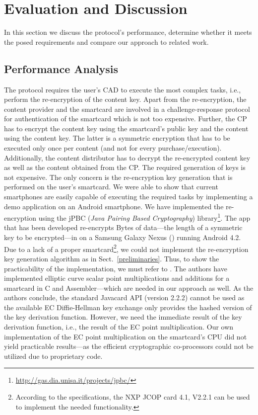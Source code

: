 \documentclass{llncs}
\newcommand{\refSec}[1]{Sect.~\ref{#1}}
\begin{document}
\section{Evaluation and Discussion} \label{evaluation}

In this section we discuss the protocol's performance, determine whether it meets the posed requirements and compare our approach to related work. 


\subsection{Performance Analysis} \label{performance_analysis}



The protocol requires the user's CAD to execute the most complex tasks, i.e., perform the re-encryption of the content key. Apart from the re-encryption, the content provider and the smartcard are involved in a challenge-response protocol for authentication of the smartcard which is not too expensive. Further, the CP has to encrypt the content key using the smartcard's public key and the content using the content key. The latter is a symmetric encryption that has to be executed only once per content (and not for every purchase/execution). Additionally, the content distributor has to decrypt the re-encrypted content key as well as the content obtained from the CP. The required generation of keys is not expensive. The only concern is the re-encryption key generation that is performed on the user's smartcard. We were able to show that current smartphones are easily capable of executing the required tasks by implementing a demo application on an Android smartphone. We have implemented the re-encryption using the jPBC (\emph{Java Pairing Based Cryptography}) library\footnote{\url{http://gas.dia.unisa.it/projects/jpbc/}}. The app that has been developed re-encrypts Bytes of data---the length of a symmetric key to be encrypted---in  on a Samsung Galaxy Nexus () running Android 4.2. Due to a lack of a proper smartcard\footnote{According to the specifications, the NXP JCOP card 4.1, V2.2.1 can be used to implement the needed functionality.}, we could not implement the re-encryption key generation algorithm  as in \refSec{preliminaries}. Thus, to show the practicability of the implementation, we must refer to \cite{smartcard}. The authors have implemented elliptic curve scalar point multiplications and additions for a smartcard in C and Assembler---which are needed in our approach as well. As the authors conclude, the standard Javacard API (version 2.2.2) cannot be used as the available EC Diffie-Hellman key exchange only provides the hashed version of the key derivation function. \cite{smartcard} However, we need the immediate result of the key derivation function, i.e., the result of the EC point multiplication. Our own implementation of the EC point multiplication on the smartcard's CPU did not yield practicable results---as the efficient cryptographic co-processors could not be utilized due to proprietary code.
\end{document}
